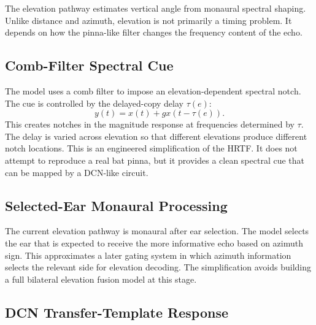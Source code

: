 The elevation pathway estimates vertical angle from monaural spectral shaping. Unlike distance and azimuth, elevation is not primarily a timing problem. It depends on how the pinna-like filter changes the frequency content of the echo.

\subsection{Comb-Filter Spectral Cue}

The model uses a comb filter to impose an elevation-dependent spectral notch. The cue is controlled by the delayed-copy delay $\tau(e)$:
\begin{equation}
    y(t)=x(t)+g x(t-\tau(e)).
\end{equation}
This creates notches in the magnitude response at frequencies determined by $\tau$. The delay is varied across elevation so that different elevations produce different notch locations. This is an engineered simplification of the HRTF. It does not attempt to reproduce a real bat pinna, but it provides a clean spectral cue that can be mapped by a DCN-like circuit.

\subsection{Selected-Ear Monaural Processing}

The current elevation pathway is monaural after ear selection. The model selects the ear that is expected to receive the more informative echo based on azimuth sign. This approximates a later gating system in which azimuth information selects the relevant side for elevation decoding. The simplification avoids building a full bilateral elevation fusion model at this stage.

\subsection{DCN Transfer-Template Response}

